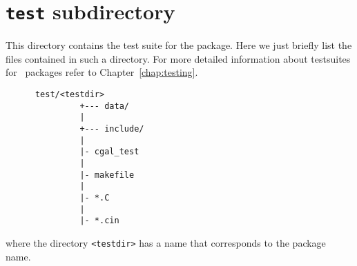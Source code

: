 \section{{\tt test} subdirectory}
\label{sec:test_subdirectory}

This directory contains the test suite for the package. Here we just
briefly list the files contained in such a directory. For more
detailed information about testsuites for \cgal\ packages refer to
Chapter~\ref{chap:testing}. 

\begin{verbatim}
      test/<testdir>
               +--- data/
               |
               +--- include/
               |
               |- cgal_test
               |
               |- makefile
               |
               |- *.C
               |
               |- *.cin
\end{verbatim}
where the directory \verb|<testdir>| has a name that corresponds to the package
name.

